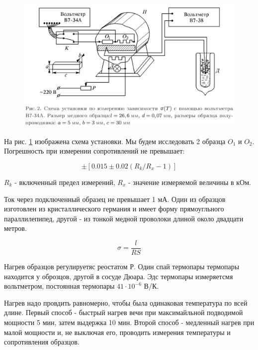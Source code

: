 \documentclass[a4paper]{article}
\begin{document}
\begin{figure}[H]
    \begin{center}
        \includegraphics[scale = 0.5]{setup1.png}
        \caption{}
        \label{setup1}
    \end{center}
\end{figure}

На рис. \ref{setup1} изображена схема установки. Мы будем исследовать 2 образца $O_1$ и $O_2$. Погрешность при измерении сопротивлений не превышает:

\begin{equation}
    \pm [0.015 \pm 0.02 (R_k/R_x - 1)]
\end{equation}

$R_k$ - включенный предел измерений, $R_x$ - значение измеряемой величины в кОм. \par 

Ток через подключенный образец не превышает 1 мА. Один из образцов изготовлен из кристаллического германия и имеет форму прямоугльного параллилепипед, другой - из тонкой медной 
проволоки длиной около двадцати метров. 

\begin{equation}
    \sigma = \frac{l}{RS}
\end{equation}

Нагрев образцов регулируетяс реостатом Р. Один спай термопары термопары находится у оброзцов, другой в сосуде Дюара. 
Эдс термопары измеряетсмя вольтметром, постоянная термопары $41 \cdot 10^{-6}$ В/К. \par 

Нагрев надо провдить равномерно, чтобы была одинаковая температура по всей длине. Первый способ - быстрый нагрев вечи при максимайльной подводимой мощности 5 мин, затем выдержка 10 мин. 
Второй способ - медленный нагрев при малой мощности и, не выключая его, проводить измерения температуры и сопротивления образцов. 
\end{document}
